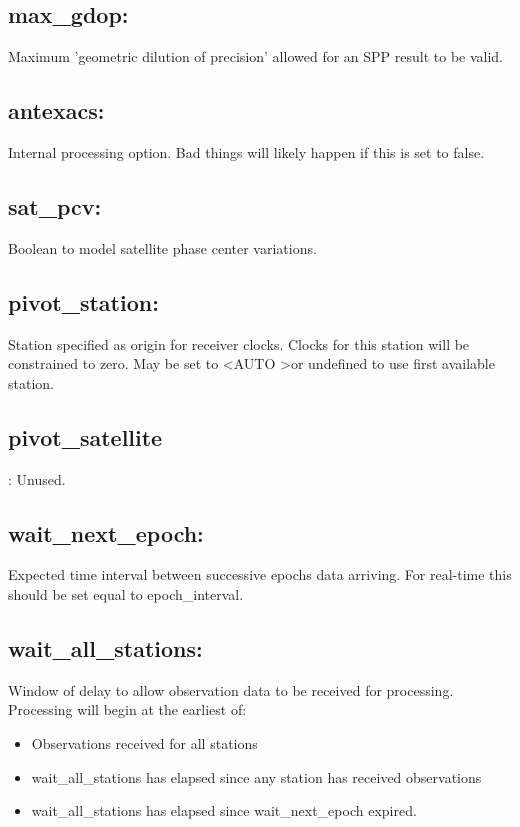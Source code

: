 \subsection*{max\_gdop:}
Maximum 'geometric dilution of precision' allowed for an SPP result to be valid.

\subsection*{antexacs:}
Internal processing option. Bad things will likely happen if this is set to false.

\subsection*{sat\_pcv:}
Boolean to model satellite phase center variations.

\subsection*{pivot\_station:}
Station specified as origin for receiver clocks. Clocks for this station will be constrained to zero. May be set to \textless AUTO \textgreater or undefined to use first available station.

\subsection*{pivot\_satellite}:
Unused.

\subsection*{wait\_next\_epoch:}
Expected time interval between successive epochs data arriving. For real-time this should be set equal to epoch\_interval.

\subsection*{wait\_all\_stations:}
Window of delay to allow observation data to be received for processing.
Processing will begin at the earliest of:
\begin{itemize}
\item Observations received for all stations
\item wait\_all\_stations has elapsed since any station has received observations
\item wait\_all\_stations has elapsed since wait\_next\_epoch expired.
\end{itemize}

